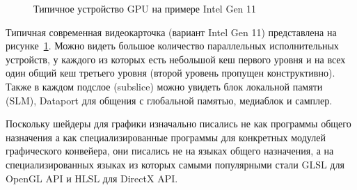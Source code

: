 \begin{figure}[ht]
    \caption{Типичное устройство GPU на примере Intel Gen 11}\label{fig:typicalGPU}
\end{figure}

Типичная современная видеокарточка (вариант Intel Gen 11) представлена на рисунке~\cref{fig:typicalGPU}. Можно видеть большое количество параллельных исполнительных устройств, у каждого из которых есть небольшой кеш первого уровня и на всех один общий кеш третьего уровня (второй уровень пропущен конструктивно). Также в каждом подслое (subslice) можно увидеть блок локальной памяти (SLM), Dataport для общения с глобальной памятью, медиаблок и самплер.

Поскольку шейдеры для графики изначально писались не как программы общего назначения а как специализированные программы для конкретных модулей графического конвейера, они писались не на языках общего назначения, а на специализированных языках из которых самыми популярными стали GLSL для OpenGL API и HLSL для DirectX API.

